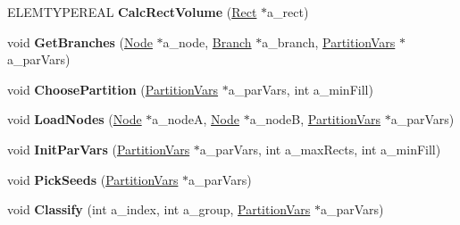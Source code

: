 \begin{DoxyCompactItemize}
\item 
\hypertarget{class_r_tree_a224ba0af4dcb435dbb016327307d664b}{\-E\-L\-E\-M\-T\-Y\-P\-E\-R\-E\-A\-L {\bfseries \-Calc\-Rect\-Volume} (\hyperlink{struct_r_tree_1_1_rect}{\-Rect} $\ast$a\-\_\-rect)}\label{class_r_tree_a224ba0af4dcb435dbb016327307d664b}

\item 
\hypertarget{class_r_tree_a2b9d627796433f3b0254a541c19ed450}{void {\bfseries \-Get\-Branches} (\hyperlink{struct_r_tree_1_1_node}{\-Node} $\ast$a\-\_\-node, \hyperlink{struct_r_tree_1_1_branch}{\-Branch} $\ast$a\-\_\-branch, \hyperlink{struct_r_tree_1_1_partition_vars}{\-Partition\-Vars} $\ast$a\-\_\-par\-Vars)}\label{class_r_tree_a2b9d627796433f3b0254a541c19ed450}

\item 
\hypertarget{class_r_tree_a282f6ef6b93f714d8a8eca3c4d587cbd}{void {\bfseries \-Choose\-Partition} (\hyperlink{struct_r_tree_1_1_partition_vars}{\-Partition\-Vars} $\ast$a\-\_\-par\-Vars, int a\-\_\-min\-Fill)}\label{class_r_tree_a282f6ef6b93f714d8a8eca3c4d587cbd}

\item 
\hypertarget{class_r_tree_a88e9eef4ad30d4dee0c783df5e6840a0}{void {\bfseries \-Load\-Nodes} (\hyperlink{struct_r_tree_1_1_node}{\-Node} $\ast$a\-\_\-node\-A, \hyperlink{struct_r_tree_1_1_node}{\-Node} $\ast$a\-\_\-node\-B, \hyperlink{struct_r_tree_1_1_partition_vars}{\-Partition\-Vars} $\ast$a\-\_\-par\-Vars)}\label{class_r_tree_a88e9eef4ad30d4dee0c783df5e6840a0}

\item 
\hypertarget{class_r_tree_aac207d4389fcca1aa0b72361d84117ec}{void {\bfseries \-Init\-Par\-Vars} (\hyperlink{struct_r_tree_1_1_partition_vars}{\-Partition\-Vars} $\ast$a\-\_\-par\-Vars, int a\-\_\-max\-Rects, int a\-\_\-min\-Fill)}\label{class_r_tree_aac207d4389fcca1aa0b72361d84117ec}

\item 
\hypertarget{class_r_tree_af4232dd5fd978fcce12ce32f9df20f58}{void {\bfseries \-Pick\-Seeds} (\hyperlink{struct_r_tree_1_1_partition_vars}{\-Partition\-Vars} $\ast$a\-\_\-par\-Vars)}\label{class_r_tree_af4232dd5fd978fcce12ce32f9df20f58}

\item 
\hypertarget{class_r_tree_a5da8614a152145988f010a0b7ff9cb4d}{void {\bfseries \-Classify} (int a\-\_\-index, int a\-\_\-group, \hyperlink{struct_r_tree_1_1_partition_vars}{\-Partition\-Vars} $\ast$a\-\_\-par\-Vars)}\label{class_r_tree_a5da8614a152145988f010a0b7ff9cb4d}


\end{DoxyCompactItemize}
